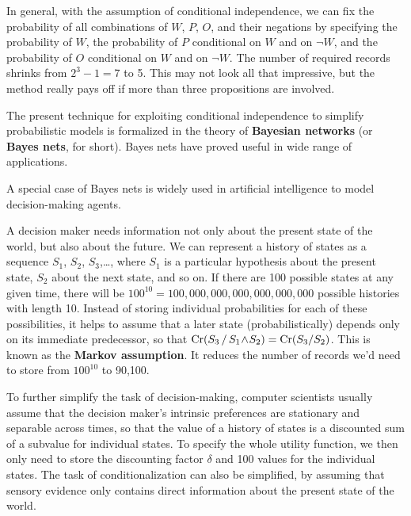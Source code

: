 In general, with the assumption of conditional independence, we can fix the
probability of all combinations of $W$, $P$, $O$, and their negations by
specifying the probability of $W$, the probability of $P$ conditional on $W$ and
on $\neg W$, and the probability of $O$ conditional on $W$ and on $\neg W$. The
number of required records shrinks from $2^3-1 = 7$ to 5. This may not look all
that impressive, but the method really pays off if more than three propositions
are involved.

The present technique for exploiting conditional independence to simplify
probabilistic models is formalized in the theory of \textbf{Bayesian networks}
(or \textbf{Bayes nets}, for short). Bayes nets have proved useful in wide range
of applications.

A special case of Bayes nets%
is widely used in artificial intelligence to model decision-making agents.

A decision maker needs information not only about the present state of the
world, but also about the future. We can represent a history of states as a
sequence $S_1$, $S_2$, $S_3$,\ldots, where $S_1$ is a particular hypothesis about
the present state, $S_2$ about the next state, and so on. If there are 100
possible states at any given time, there will be
$100^{10} = 100,000,000,000,000,000,000$ possible histories with length 10.
Instead of storing individual probabilities for each of these possibilities, it
helps to assume that a later state (probabilistically) depends only on its
immediate predecessor, so that $\text{Cr}(S_3\,/\,S_1 \!\land\! S_2) = \text{Cr}(S_3/S_2)$. This is
known as the \textbf{Markov assumption}. It reduces the number of records we'd
need to store from $100^{10}$ to 90,100.%

To further simplify the task of decision-making, computer scientists usually
assume that the decision maker's intrinsic preferences are stationary and
separable across times, so that the value of a history of states is a discounted
sum of a subvalue for individual states. To specify the whole utility
function, we then only need to store the discounting factor $\delta$ and 100
values for the individual states. The task of conditionalization can also be
simplified, by assuming that sensory evidence only contains direct information
about the present state of the world.

